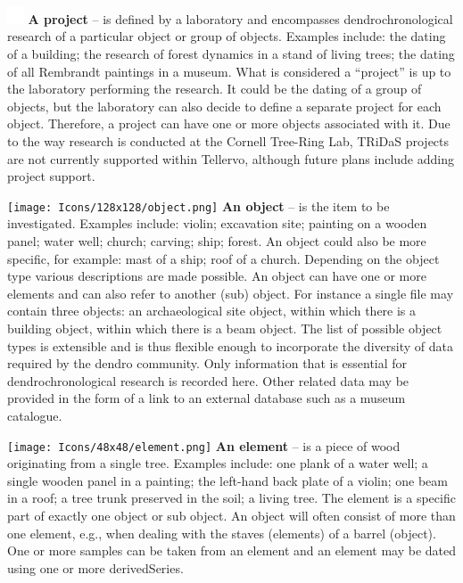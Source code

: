 \begin{description}

\item \includegraphics[width=5mm]{Images/pixel.png}  \textbf{A project} -- is defined by a laboratory and encompasses dendrochronological research of a particular object or group of objects.  Examples include: the dating of a building; the research of forest dynamics in a stand of living trees; the dating of all Rembrandt paintings in a museum. What is considered a ``project'' is up to the laboratory performing the research. It could be the dating of a group of objects, but the laboratory can also decide to define a separate project for each object. Therefore, a project can have one or more objects associated with it.  Due to the way research is conducted at the Cornell Tree-Ring Lab, TRiDaS projects are not currently supported within Tellervo, although future plans include adding project support.

\item \texttt{[image: Icons/128x128/object.png]} \textbf{An object} -- is the item to be investigated.  Examples include: violin; excavation site; painting on a wooden panel; water well; church; carving; ship; forest. An object could also be more specific, for example: mast of a ship; roof of a church. Depending on the object type various descriptions are made possible. An object can have one or more elements and can also refer to another (sub) object.  For instance a single file may contain three objects: an archaeological site object, within which there is a building object, within which there is a beam object.  The list of possible object types is extensible and is thus flexible enough to incorporate the diversity of data required by the dendro community.  Only information that is essential for dendrochronological research is recorded here. Other related data may be provided in the form of a link to an external database such as a museum catalogue. 

\item \texttt{[image: Icons/48x48/element.png]} \textbf{An element} -- is a piece of wood originating from a single tree. Examples include: one plank of a water well; a single wooden panel in a painting; the left-hand back plate of a violin; one beam in a roof; a tree trunk preserved in the soil; a living tree. The element is a specific part of exactly one object or sub object.  An object will often consist of more than one element, e.g., when dealing with the staves (elements) of a barrel (object).  One or more samples can be taken from an element and an element may be dated using one or more derivedSeries.


\end{description}

